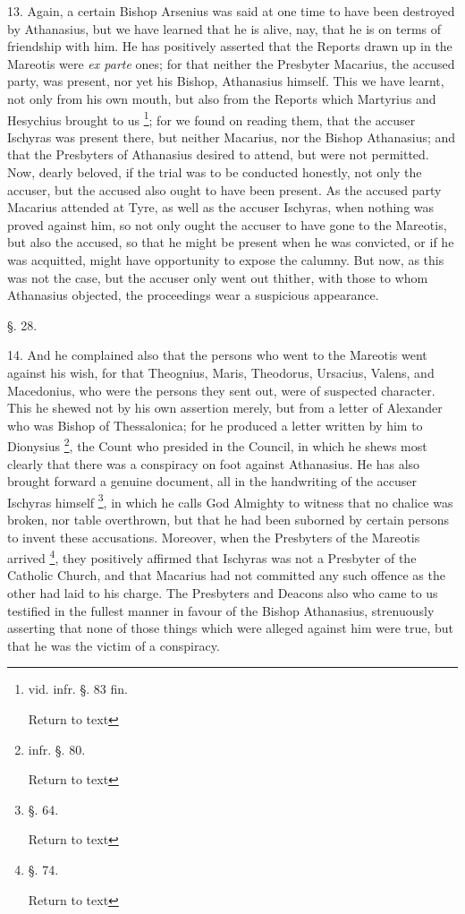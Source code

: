 13. Again, a certain Bishop Arsenius was said at
one time to have been destroyed by Athanasius, but we have learned
that he is alive, nay, that he is on terms of friendship with him. He
has positively asserted that the Reports drawn up in the Mareotis were
\emph{ex parte} ones; for that neither the Presbyter Macarius, the
accused party, was present, nor yet his Bishop, Athanasius himself.
This we have learnt, not only from his own mouth, but also from the
Reports which Martyrius and Hesychius brought to us \footnote{vid. infr. §. 83 fin.

Return to text}; for we found on reading them, that the accuser Ischyras was
present there, but neither Macarius, nor the Bishop Athanasius; and
that the Presbyters of Athanasius desired to attend, but were not
permitted. Now, dearly beloved, if the trial was to be conducted
honestly, not only the accuser, but the accused also ought to have
been present. As the accused party Macarius attended at Tyre, as well
as the accuser Ischyras, when nothing was proved against him, so not
only ought the accuser to have gone to the Mareotis, but also the
accused, so that he might be present when he was convicted, or if he
was acquitted, might have opportunity to expose the calumny. But now,
as this was not the case, but the accuser only went out thither, with
those to whom Athanasius objected, the proceedings wear a suspicious
appearance.

§. 28.

14. And he complained also that the persons who
went to the Mareotis went against his wish, for that Theognius, Maris,
Theodorus, Ursacius, Valens, and Macedonius, who were the persons they
sent out, were of suspected character. This he shewed not by his own
assertion merely, but from a letter of Alexander who was Bishop of
Thessalonica; for he produced a letter written by him to Dionysius \footnote{infr. §. 80.

Return to text}, the Count who presided in the Council, in which he shews most
clearly that there was a conspiracy on foot against Athanasius. He has
also brought forward a genuine document, all in the handwriting of the
accuser Ischyras himself \footnote{§. 64.

Return to text},
in which he calls God Almighty to witness that no chalice was broken,
nor table overthrown, but that he had been suborned by certain persons
to invent these accusations. Moreover, when the Presbyters of the
Mareotis arrived \footnote{§. 74.

Return to text},
they positively affirmed that Ischyras was not a Presbyter of the
Catholic Church, and that Macarius had not committed any such offence
as the other had laid to his charge. The Presbyters and Deacons also
who came to us testified in the fullest manner in favour of the Bishop
Athanasius, strenuously asserting that none of those things which were
alleged against him were true, but that he was the victim of a
conspiracy.

